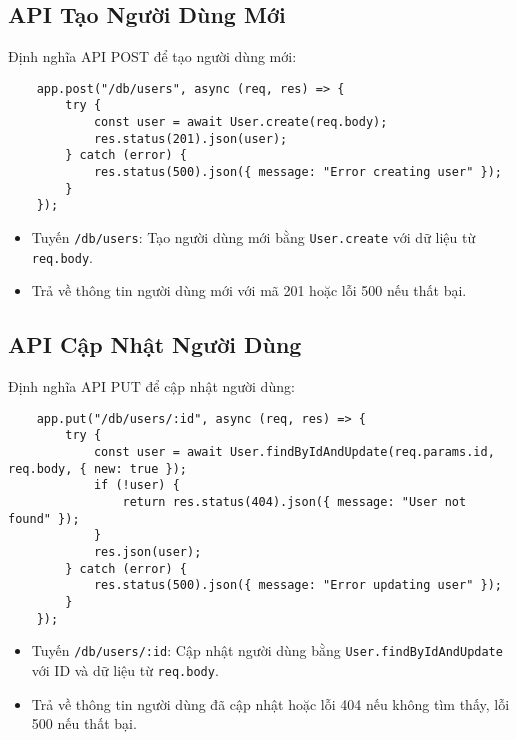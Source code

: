         \subsection{API Tạo Người Dùng Mới}
            \hspace*{0.6cm}Định nghĩa API POST để tạo người dùng mới:
            \begin{lstlisting}
    app.post("/db/users", async (req, res) => {
        try {
            const user = await User.create(req.body);
            res.status(201).json(user);
        } catch (error) {
            res.status(500).json({ message: "Error creating user" });
        }
    });
            \end{lstlisting}
            \begin{itemize}
                \item Tuyến \texttt{/db/users}: Tạo người dùng mới bằng \texttt{User.create} với dữ liệu từ \texttt{req.body}.
                \item Trả về thông tin người dùng mới với mã 201 hoặc lỗi 500 nếu thất bại.
            \end{itemize}

        \subsection{API Cập Nhật Người Dùng}
            \hspace*{0.6cm}Định nghĩa API PUT để cập nhật người dùng:
            \begin{lstlisting}
    app.put("/db/users/:id", async (req, res) => {
        try {
            const user = await User.findByIdAndUpdate(req.params.id, req.body, { new: true });
            if (!user) {
                return res.status(404).json({ message: "User not found" });
            }
            res.json(user);
        } catch (error) {
            res.status(500).json({ message: "Error updating user" });
        }
    });
            \end{lstlisting}
            \begin{itemize}
                \item Tuyến \texttt{/db/users/:id}: Cập nhật người dùng bằng \texttt{User.findByIdAndUpdate} với ID và dữ liệu từ \texttt{req.body}.
                \item Trả về thông tin người dùng đã cập nhật hoặc lỗi 404 nếu không tìm thấy, lỗi 500 nếu thất bại.
            \end{itemize}

